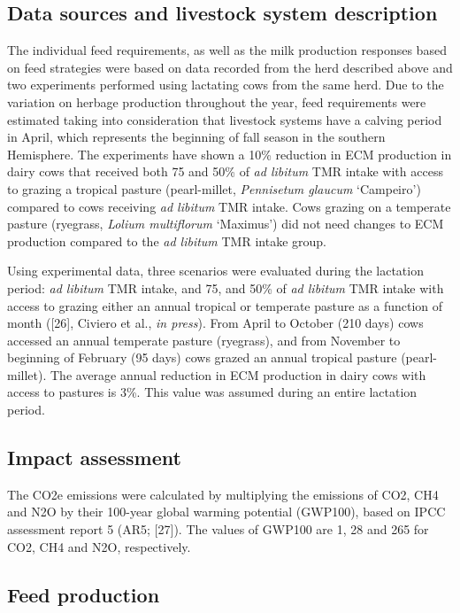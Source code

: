 \documentclass[11pt,a4paper]{article}
\begin{document}
\subsection{Data sources and livestock system description}

The individual feed requirements, as well as the milk production responses based on feed strategies were based on data recorded from the herd described above and two experiments performed using lactating cows from the same herd. Due to the variation on herbage production throughout the year, feed requirements were estimated taking into consideration that livestock systems have a calving period in April, which represents the beginning of fall season in the southern Hemisphere. The experiments have shown a 10\% reduction in ECM production in dairy cows that received both 75 and 50\% of \textit{ad libitum} TMR intake with access to grazing a tropical pasture (pearl-millet, \textit{Pennisetum glaucum} ‘Campeiro’) compared to cows receiving \textit{ad libitum} TMR intake. Cows grazing on a temperate pasture (ryegrass, \textit{Lolium multiflorum} ‘Maximus’) did not need changes to ECM production compared to the \textit{ad libitum} TMR intake group.

Using experimental data, three scenarios were evaluated during the lactation period: \textit{ad libitum} TMR intake, and 75, and 50\% of \textit{ad libitum} TMR intake with access to grazing either an annual tropical or temperate pasture as a function of month ([26], Civiero et al., \textit{in press}). From April to October (210 days) cows accessed an annual temperate pasture (ryegrass), and from November to beginning of February (95 days) cows grazed an annual tropical pasture (pearl-millet). The average annual reduction in ECM production in dairy cows with access to pastures is 3\%. This value was assumed during an entire lactation period.

\subsection{Impact assessment}

The CO2e emissions were calculated by multiplying the emissions of CO2, CH4 and N2O by their 100-year global warming potential (GWP100), based on IPCC assessment report 5 (AR5; [27]). The values of GWP100 are 1, 28 and 265 for CO2, CH4 and N2O, respectively.

\subsection{Feed production}
\end{document}
